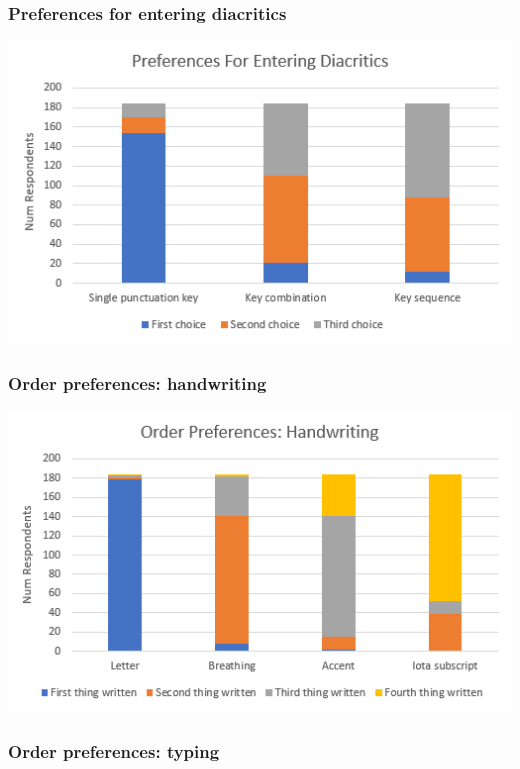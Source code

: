 \documentclass[11pt]{article}
\begin{document}
\subsubsection{Preferences for entering diacritics}
\label{sec:org0220baa}

\begin{center}
\includegraphics[width=.9\linewidth]{./images/diacritic-entry-preferences.PNG}
\end{center}

\subsubsection{Order preferences: handwriting}
\label{sec:org6aabf3c}

\begin{center}
\includegraphics[width=.9\linewidth]{./images/diacritic-entry-order-writing.PNG}
\end{center}

\subsubsection{Order preferences: typing}
\label{sec:orgfc826aa}
\end{document}
